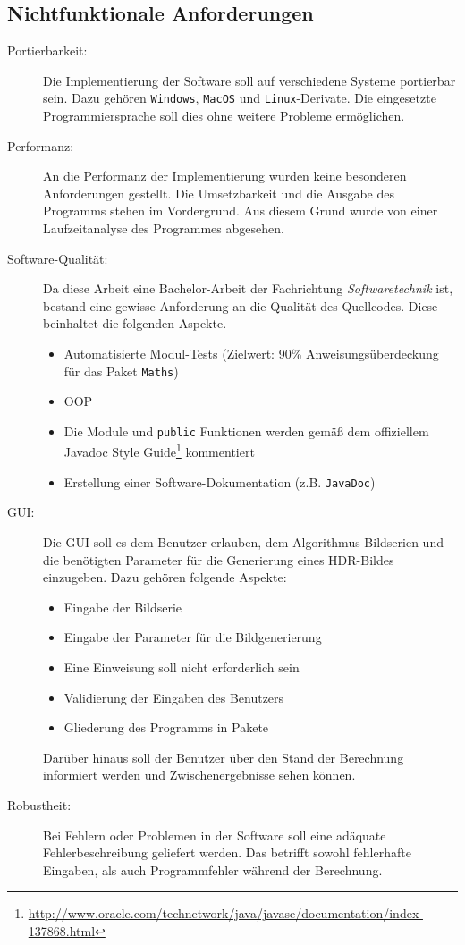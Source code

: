 \subsection{Nichtfunktionale Anforderungen}
\label{nfa}
\begin{description}
    \item[Portierbarkeit:] Die Implementierung der Software soll auf verschiedene Systeme portierbar sein. Dazu gehören \texttt{Windows}, \texttt{MacOS} und \texttt{Linux}-Derivate. Die eingesetzte Programmiersprache soll dies ohne weitere Probleme ermöglichen.
    
    \item[Performanz:] An die Performanz der Implementierung wurden keine besonderen Anforderungen gestellt. Die Umsetzbarkeit und die Ausgabe des Programms stehen im Vordergrund. Aus diesem Grund wurde von einer Laufzeitanalyse des Programmes abgesehen.
    
    \item[Software-Qualität:] Da diese Arbeit eine Bachelor-Arbeit der Fachrichtung \textit{Softwaretechnik} ist, bestand eine gewisse Anforderung an die Qualität des Quellcodes. Diese beinhaltet die folgenden Aspekte.
    \begin{itemize}
        \item Automatisierte Modul-Tests (Zielwert: 90\% Anweisungsüberdeckung für das Paket \texttt{Maths})
        \item \gls{OOP}
        \item Die Module und \texttt{public} Funktionen werden gemäß dem offiziellem Javadoc Style Guide\footnote{\url{http://www.oracle.com/technetwork/java/javase/documentation/index-137868.html}} kommentiert
        \item Erstellung einer Software-Dokumentation (z.B. \texttt{JavaDoc})
    \end{itemize}
    \item[\Gls{GUI}:] Die \gls{GUI} soll es dem Benutzer erlauben, dem Algorithmus Bildserien und die benötigten Parameter für die Generierung eines \gls{HDR}-Bildes einzugeben. Dazu gehören folgende Aspekte:
    \begin{itemize}
        \item Eingabe der Bildserie
        \item Eingabe der Parameter für die Bildgenerierung
        \item Eine Einweisung soll nicht erforderlich sein
        \item Validierung der Eingaben des Benutzers
        \item Gliederung des Programms in Pakete
    \end{itemize}

    Darüber hinaus soll der Benutzer über den Stand der Berechnung informiert werden und Zwischenergebnisse sehen können. 
    
    \item[Robustheit:] Bei Fehlern oder Problemen in der Software soll eine adäquate Fehlerbeschreibung geliefert werden. Das betrifft sowohl fehlerhafte Eingaben, als auch Programmfehler während der Berechnung.
\end{description}




